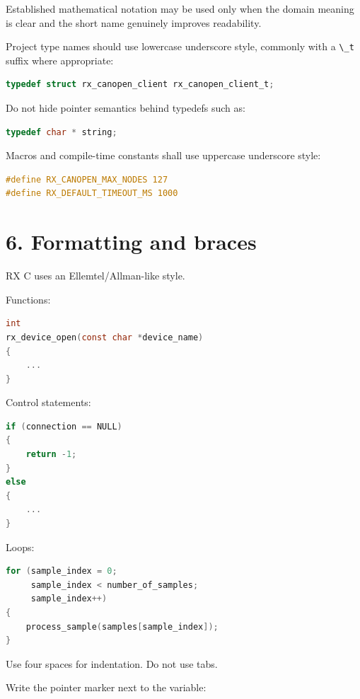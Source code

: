 \documentclass[11pt,a4paper]{article}
\begin{document}
Established mathematical notation may be used only when the domain
meaning is clear and the short name genuinely improves readability.

Project type names should use lowercase underscore style, commonly with
a \passthrough{\lstinline!\_t!} suffix where appropriate:

\begin{lstlisting}[language=C]
typedef struct rx_canopen_client rx_canopen_client_t;
\end{lstlisting}

Do not hide pointer semantics behind typedefs such as:

\begin{lstlisting}[language=C]
typedef char * string;
\end{lstlisting}

Macros and compile-time constants shall use uppercase underscore style:

\begin{lstlisting}[language=C]
#define RX_CANOPEN_MAX_NODES 127
#define RX_DEFAULT_TIMEOUT_MS 1000
\end{lstlisting}

\section{6. Formatting and braces}\label{6-formatting-and-braces}

RX C uses an Ellemtel/Allman-like style.

Functions:

\begin{lstlisting}[language=C]
int
rx_device_open(const char *device_name)
{
    ...
}
\end{lstlisting}

Control statements:

\begin{lstlisting}[language=C]
if (connection == NULL)
{
    return -1;
}
else
{
    ...
}
\end{lstlisting}

Loops:

\begin{lstlisting}[language=C]
for (sample_index = 0;
     sample_index < number_of_samples;
     sample_index++)
{
    process_sample(samples[sample_index]);
}
\end{lstlisting}

Use four spaces for indentation. Do not use tabs.

Write the pointer marker next to the variable:
\end{document}
